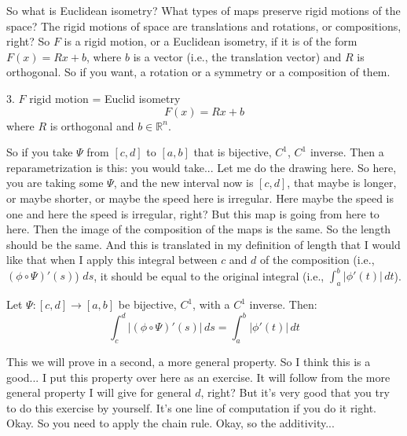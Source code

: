 \begin{spoken-clean}[13:55 - 15:07]
So what is Euclidean isometry? What types of maps preserve rigid motions of the space? The rigid motions of space are translations and rotations, or compositions, right? So $F$ is a rigid motion, or a Euclidean isometry, if it is of the form $F(x) = Rx+b$, where $b$ is a vector (i.e., the translation vector) and $R$ is orthogonal. So if you want, a rotation or a symmetry or a composition of them.
\end{spoken-clean}

\begin{math-stroke}
3. $F$ rigid motion = Euclid isometry
\[
F(x) = Rx+b
\]
where $R$ is orthogonal and $b \in \mathbb{R}^n$.
\end{math-stroke}

\begin{spoken-clean}[15:07 - 17:22]
So if you take $\Psi$ from $[c,d]$ to $[a,b]$ that is bijective, $C^1$, $C^1$ inverse. Then a reparametrization is this: you would take... Let me do the drawing here. So here, you are taking some $\Psi$, and the new interval now is $[c,d]$, that maybe is longer, or maybe shorter, or maybe the speed here is irregular. Here maybe the speed is one and here the speed is irregular, right? But this map is going from here to here. Then the image of the composition of the maps is the same. So the length should be the same. And this is translated in my definition of length that I would like that when I apply this integral between $c$ and $d$ of the composition (i.e., $(\phi \circ \Psi)'(s)$) $ds$, it should be equal to the original integral (i.e., $\int_a^b |\phi'(t)| \, dt$).
\end{spoken-clean}

\begin{math-stroke}
Let $\Psi: [c,d] \to [a,b]$ be bijective, $C^1$, with a $C^1$ inverse. Then:
\[
\int_c^d |(\phi \circ \Psi)'(s)| \, ds = \int_a^b |\phi'(t)| \, dt
\]
\end{math-stroke}

\begin{spoken-clean}[17:22 - 17:52]
This we will prove in a second, a more general property. So I think this is a good... I put this property over here as an exercise. It will follow from the more general property I will give for general $d$, right? But it's very good that you try to do this exercise by yourself. It's one line of computation if you do it right. Okay. So you need to apply the chain rule. Okay, so the additivity...
\end{spoken-clean}

